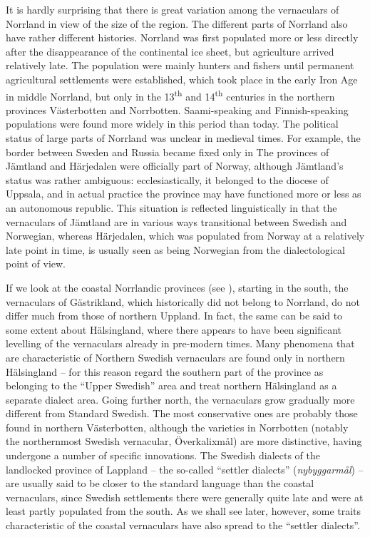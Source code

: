 It is hardly surprising that there is great variation among the vernaculars of Norrland in view of the size of the region. The different parts of Norrland also have rather different histories. Norrland was first populated more or less directly after the disappearance of the continental ice sheet, but agriculture arrived relatively late. The population were mainly hunters and fishers until permanent agricultural settlements were established, which took place in the early Iron Age in middle Norrland, but only in the 13\textsuperscript{th} and 14\textsuperscript{th} centuries in the northern provinces Västerbotten and Norrbotten. Saami-speaking and Finnish-speaking populations were found more widely in this period than today. The political status of large parts of Norrland was unclear in medieval times. For example, the border between Sweden and Russia became fixed only in  The provinces of Jämtland and Härjedalen were officially part of Norway, although Jämtland’s status was rather ambiguous: ecclesiastically, it belonged to the diocese of Uppsala, and in actual practice the province may have functioned more or less as an autonomous republic. This situation is reflected linguistically in that the vernaculars of Jämtland are in various ways transitional between Swedish and Norwegian, whereas Härjedalen, which was populated from Norway at a relatively late point in time, is usually seen as being Norwegian from the dialectological point of view.

If we look at the coastal Norrlandic provinces (see ), starting in the south, the vernaculars of Gästrikland, which historically did not belong to Norrland, do not differ much from those of northern Uppland. In fact, the same can be said to some extent about Hälsingland, where there appears to have been significant levelling of the vernaculars already in pre-modern times. Many phenomena that are characteristic of Northern Swedish vernaculars are found only in northern Hälsingland – for this reason \citet[230]{ÅgrenEtAl1954} regard the southern part of the province as belonging to the “Upper Swedish” area and treat northern Hälsingland as a separate dialect area. Going further north, the vernaculars grow gradually more different from Standard Swedish. The most conservative ones are probably those found in northern Västerbotten, although the varieties in Norrbotten (notably the northernmost Swedish vernacular, Överkalixmål) are more distinctive, having undergone a number of specific innovations. The Swedish dialects of the landlocked province of Lappland – the so-called “settler dialects” (\textit{nybyggarmål}) – are usually said to be closer to the standard language than the coastal vernaculars, since Swedish settlements there were generally quite late and were at least partly populated from the south. As we shall see later, however, some traits characteristic of the coastal vernaculars have also spread to the “settler dialects”. 

